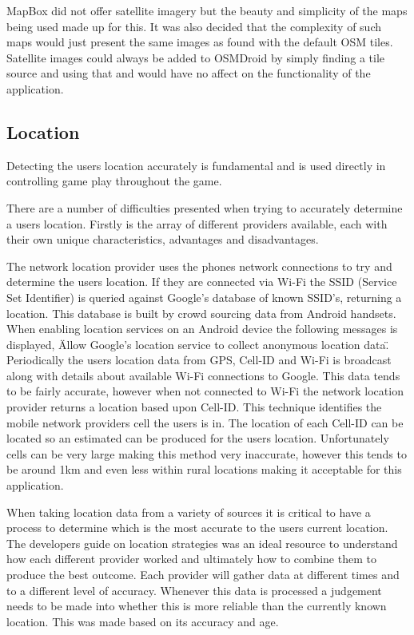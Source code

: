 MapBox did not offer satellite imagery but the beauty and simplicity of the maps being used made up for this. It was also decided that the complexity of such maps would just present the same images as found with the default OSM tiles. Satellite images could always be added to OSMDroid by simply finding a tile source and using that and would have no affect on the functionality of the application. 


\subsection{Location}
Detecting the users location accurately is fundamental and is used directly in controlling game play throughout the game.

There are a number of difficulties presented when trying to accurately determine a users location. Firstly is the array of different providers available, each with their own unique characteristics, advantages and disadvantages.

The network location provider uses the phones network connections to try and determine the users location. If they are connected via Wi-Fi the SSID (Service Set Identifier) is queried against Google's database of known SSID's, returning a location. This database is built by crowd sourcing data from Android handsets. When enabling location services on an Android device the following messages is displayed, \"Allow Google's location service to collect anonymous location data\". Periodically the users location data from GPS, Cell-ID and Wi-Fi is broadcast along with details about available Wi-Fi connections to Google. This data tends to be fairly accurate, however when not connected to Wi-Fi the network location provider returns a location based upon Cell-ID. This technique identifies the mobile network providers cell the users is in. The location of each Cell-ID can be located so an estimated can be produced for the users location. Unfortunately cells can be very large making this method very inaccurate, however this tends to be around 1km and even less within rural locations\cite{1377314} making it acceptable for this application.

When taking location data from a variety of sources it is critical to have a process to determine which is the most accurate to the users current location. The developers guide on location strategies\cite{location} was an ideal resource to understand how each different provider worked and ultimately how to combine them to produce the best outcome. Each provider will gather data at different times and to a different level of accuracy. Whenever this data is processed a judgement needs to be made into whether this is more reliable than the currently known location. This was made based on its accuracy and age.

